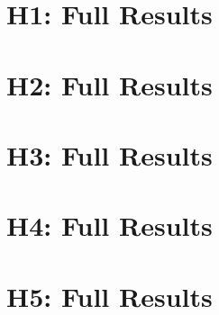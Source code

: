 \documentclass[11pt]{article}
\begin{document}


\appendix

\section{H1: Full Results}
\label{app:h1}

\section{H2: Full Results}
\label{app:h2}

\section{H3: Full Results}
\label{app:h3}

\section{H4: Full Results}
\label{app:h4}

\section{H5: Full Results}
\label{app:h5}
\end{document}
